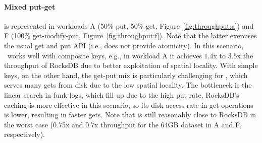 

\paragraph{ Mixed put-get} is represented in workloads A (50\% put, 50\% get, Figure~\ref{fig:throughput:a}) and 
F (100\% get-modify-put, Figure~\ref{fig:throughput:f}). Note that the latter exercises the usual get and put API (i.e., does not provide atomicity). 
In this scenario, \sys\ works well with composite keys, e.g., in workload A it  achieves $1.4$x to $3.5$x the throughput of RocksDB due to better exploitation of spatial locality. 
With simple keys, on the other hand, the get-put mix is particularly challenging for \sys, which serves many gets from disk due to the
low spatial locality. The bottleneck is the linear search in funk logs, which  fill
up due to the high put rate.
RocksDB's caching is more effective in this scenario, so its disk-access rate in get operations is lower,  resulting in faster gets. 
Note that \sys\/ is still reasonably close to RocksDB in the worst case 
(0.75x and 0.7x throughput for the 64GB dataset in A and F, respectively).

